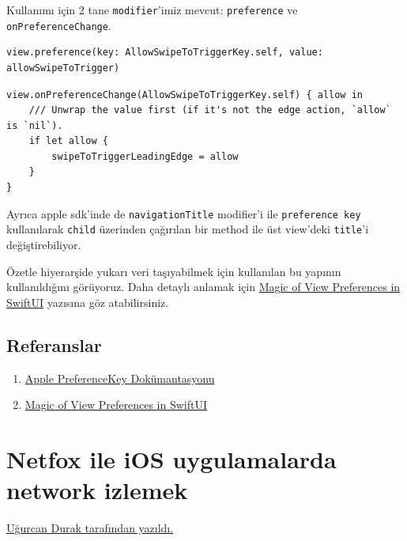 \documentclass[24pt]{article}
\begin{document}
Kullanımı için 2 tane \texttt{modifier}'imiz mevcut: \texttt{preference} ve \texttt{onPreferenceChange}.

\begin{listing}[htbp]
\begin{verbatim}
view.preference(key: AllowSwipeToTriggerKey.self, value: allowSwipeToTrigger)
\end{verbatim}
\caption{Preference Key ile veriyi yukarı aktarma}
\end{listing}

\begin{listing}[htbp]
\begin{verbatim}
view.onPreferenceChange(AllowSwipeToTriggerKey.self) { allow in
    /// Unwrap the value first (if it's not the edge action, `allow` is `nil`).
    if let allow {
        swipeToTriggerLeadingEdge = allow
    }
}
\end{verbatim}
\caption{Preference Key ile aşağıdan gelen veriyi okuma}
\end{listing}

Ayrıca apple sdk'inde de \texttt{navigationTitle} modifier'i ile \texttt{preference key} kullanılarak \texttt{child} üzerinden çağırılan bir method ile üst view'deki \texttt{title}'i değiştirebiliyor.

Özetle hiyerarşide yukarı veri taşıyabilmek için kullanılan bu yapının kullanıldığını görüyoruz.
Daha detaylı anlamak için \href{https://swiftwithmajid.com/2020/01/15/the-magic-of-view-preferences-in-swiftui/}{Magic of View Preferences in SwiftUI} yazısına göz atabilirsiniz.

\subsection{Referanslar}
\label{sec:org6710808}
\begin{enumerate}
\item \href{https://developer.apple.com/documentation/swiftui/preferences?changes=\_7}{Apple PreferenceKey Dokümantasyonu}
\item \href{https://swiftwithmajid.com/2020/01/15/the-magic-of-view-preferences-in-swiftui/}{Magic of View Preferences in SwiftUI}
\end{enumerate}

\newpage
\thispagestyle{empty}

\section{Netfox ile iOS uygulamalarda network izlemek}
\label{sec:org3089b19}
\uline{\href{https://www.linkedin.com/in/ugurcan-durak/}{Uğurcan Durak} tarafından yazıldı.}
\end{document}
